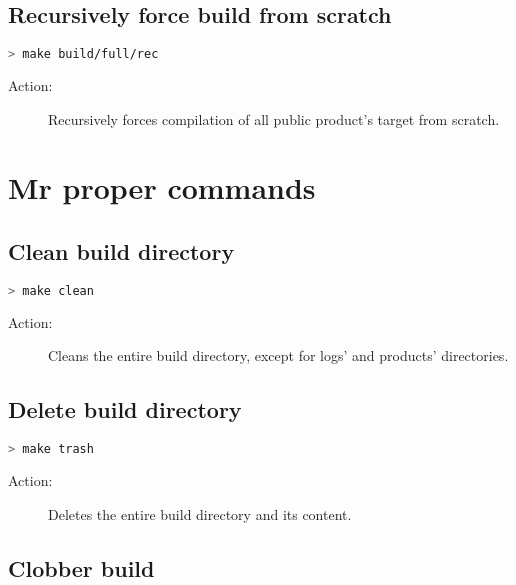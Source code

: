 \subsection{Recursively force build from scratch}

\begin{lstlisting}[language=bash]
> make build/full/rec
\end{lstlisting}

\begin{description}
    \item[Action:] Recursively forces compilation of all public product's target from scratch.
\end{description}


\section{Mr proper commands}

\subsection{Clean build directory}

\begin{lstlisting}[language=bash]
> make clean
\end{lstlisting}

\begin{description}
    \item[Action:] Cleans the entire build directory, except for logs' and products' directories.
\end{description}


\subsection{Delete build directory}

\begin{lstlisting}[language=bash]
> make trash
\end{lstlisting}

\begin{description}
    \item[Action:] Deletes the entire build directory and its content.
\end{description}


\subsection{Clobber build}

